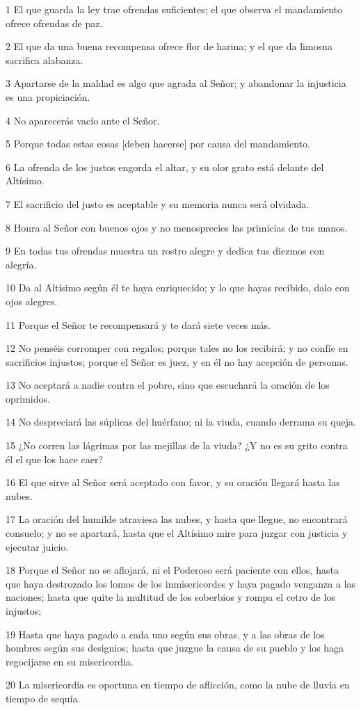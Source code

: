 \par 1 El que guarda la ley trae ofrendas suficientes; el que observa el mandamiento ofrece ofrendas de paz.
\par 2 El que da una buena recompensa ofrece flor de harina; y el que da limosna sacrifica alabanza.
\par 3 Apartarse de la maldad es algo que agrada al Señor; y abandonar la injusticia es una propiciación.
\par 4 No aparecerás vacío ante el Señor.
\par 5 Porque todas estas cosas [deben hacerse] por causa del mandamiento.
\par 6 La ofrenda de los justos engorda el altar, y su olor grato está delante del Altísimo.
\par 7 El sacrificio del justo es aceptable y su memoria nunca será olvidada.
\par 8 Honra al Señor con buenos ojos y no menosprecies las primicias de tus manos.
\par 9 En todas tus ofrendas muestra un rostro alegre y dedica tus diezmos con alegría.
\par 10 Da al Altísimo según él te haya enriquecido; y lo que hayas recibido, dalo con ojos alegres.
\par 11 Porque el Señor te recompensará y te dará siete veces más.
\par 12 No penséis corromper con regalos; porque tales no los recibirá; y no confíe en sacrificios injustos; porque el Señor es juez, y en él no hay acepción de personas.
\par 13 No aceptará a nadie contra el pobre, sino que escuchará la oración de los oprimidos.
\par 14 No despreciará las súplicas del huérfano; ni la viuda, cuando derrama su queja.
\par 15 ¿No corren las lágrimas por las mejillas de la viuda? ¿Y no es su grito contra él el que los hace caer?
\par 16 El que sirve al Señor será aceptado con favor, y su oración llegará hasta las nubes.
\par 17 La oración del humilde atraviesa las nubes, y hasta que llegue, no encontrará consuelo; y no se apartará, hasta que el Altísimo mire para juzgar con justicia y ejecutar juicio.
\par 18 Porque el Señor no se aflojará, ni el Poderoso será paciente con ellos, hasta que haya destrozado los lomos de los inmisericordes y haya pagado venganza a las naciones; hasta que quite la multitud de los soberbios y rompa el cetro de los injustos;
\par 19 Hasta que haya pagado a cada uno según sus obras, y a las obras de los hombres según sus designios; hasta que juzgue la causa de su pueblo y los haga regocijarse en su misericordia.
\par 20 La misericordia es oportuna en tiempo de aflicción, como la nube de lluvia en tiempo de sequía.

